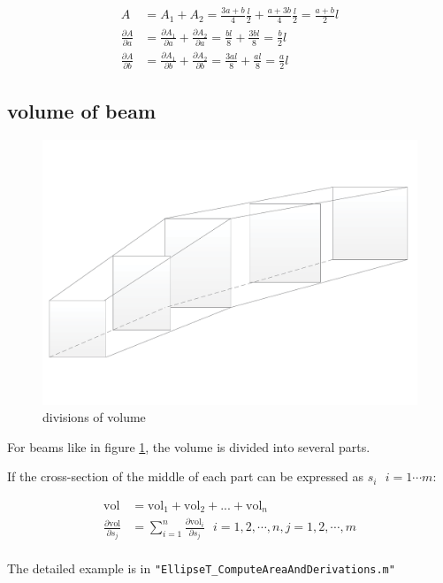 \begin{align*}
	A &= A_1 + A_2 = \frac{3a+b}{4} \frac{l}{2} + \frac{a+3b}{4} \frac{l}{2} = \frac{a+b}{2} l \\
	\frac{\partial A}{\partial a} &= \frac{\partial A_1}{\partial a} + \frac{\partial A_2}{\partial a} = \frac{bl}{8} + \frac{3bl}{8} = \frac{b}{2} l \\
	\frac{\partial A}{\partial b} &=\frac{\partial A_1}{\partial b} + \frac{\partial A_2}{\partial b} = \frac{3al}{8} + \frac{al}{8} = \frac{a}{2} l
\end{align*}

\subsection{volume of beam}
\begin{figure}[h!]
\centering
\includegraphics[width=0.5\linewidth]{Figures/beamVol_divisions}
\caption{divisions of volume}
\label{fig: divisions of volume}
\end{figure}

For beams like in figure \ref{fig: divisions of volume}, the volume is divided into several parts.

If the cross-section of the middle of each part can be expressed as $ s_i~~~i=1 \cdots m $:

\begin{align*}\label{key}
\mathrm{vol} &= \mathrm{vol}_1 + \mathrm{vol}_2 + ... + \mathrm{vol}_n \\
\frac{\partial \mathrm{vol}}{\partial s_j} &= \sum_{i=1}^{n} \frac{\partial \mathrm{vol}_i}{\partial s_j} ~~~ i = 1,2, \cdots,n, j = 1,2,\cdots,m\\
\end{align*}

The detailed example is in \lstinline{"EllipseT_ComputeAreaAndDerivations.m"}
